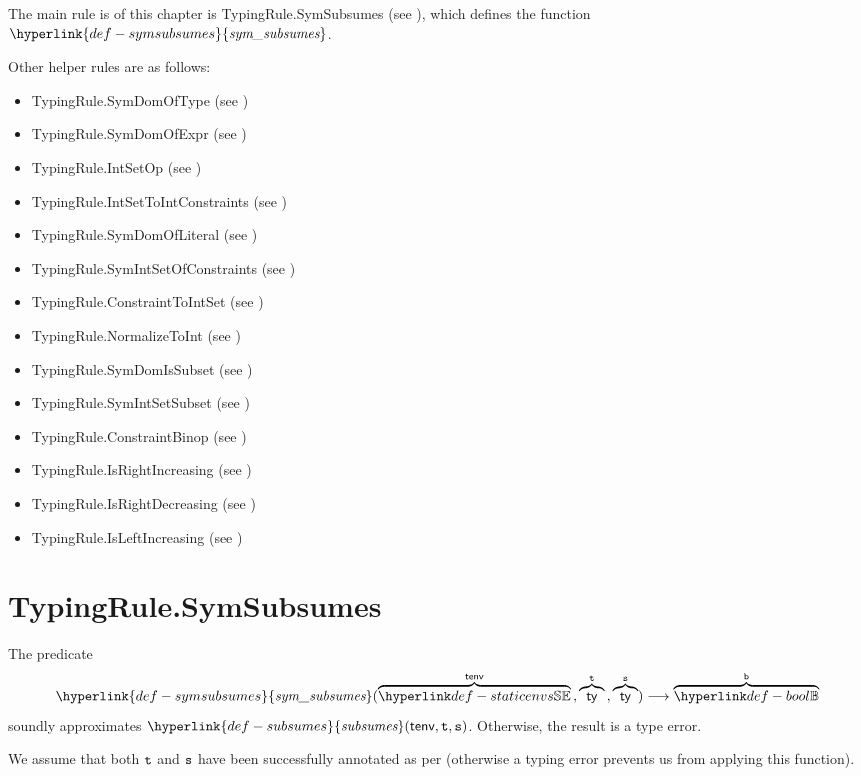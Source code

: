\documentclass{book}
\newcommand\ProseOtherwiseTypeError[0]{Otherwise, the result is a type error.}
\newcommand\subsumes[0]{\hyperlink{def-subsumes}{\textfunc{subsumes}}}
\newcommand\symsubsumes[0]{\hyperlink{def-symsubsumes}{\textfunc{sym\_subsumes}}}
\begin{document}
The main rule is of this chapter is TypingRule.SymSubsumes (see ), which defines the function
$\symsubsumes$.

Other helper rules are as follows:
\begin{itemize}
  \item TypingRule.SymDomOfType (see )
  \item TypingRule.SymDomOfExpr (see )
  \item TypingRule.IntSetOp (see )
  \item TypingRule.IntSetToIntConstraints (see )
  \item TypingRule.SymDomOfLiteral (see )
  \item TypingRule.SymIntSetOfConstraints (see )
  \item TypingRule.ConstraintToIntSet (see )
  \item TypingRule.NormalizeToInt (see )
  \item TypingRule.SymDomIsSubset (see )
  \item TypingRule.SymIntSetSubset (see )
  \item TypingRule.ConstraintBinop (see )
  \item TypingRule.IsRightIncreasing (see )
  \item TypingRule.IsRightDecreasing (see )
  \item TypingRule.IsLeftIncreasing (see )
\end{itemize}

\section{TypingRule.SymSubsumes \label{sec:TypingRule.SymSubsumes}}
\hypertarget{def-symsubsumes}{}
The predicate
\[
  \symsubsumes(\overname{\staticenvs}{\tenv} \aslsep \overname{\ty}{\vt} \aslsep \overname{\ty}{\vs})
  \aslto \overname{\Bool}{\vb}
\]
soundly approximates $\subsumes(\tenv, \vt, \vs)$.
\ProseOtherwiseTypeError

We assume that both $\texttt{t}$ and $\texttt{s}$ have been successfully annotated as per 
(otherwise a typing error prevents us from applying this function).
\end{document}
